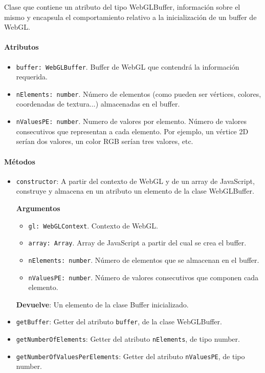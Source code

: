 Clase que contiene un atributo del tipo WebGLBuffer, información sobre el mismo y encapsula el comportamiento relativo a la inicialización de un buffer de WebGL. 

\paragraph*{Atributos}
\begin{itemize}
    \item \verb|buffer: WebGLBuffer|. Buffer de WebGL que contendrá la información requerida.
    \item \verb|nElements: number|. Número de elementos (como pueden ser vértices, colores, coordenadas de textura...) almacenadas en el buffer.
    \item \verb|nValuesPE: number|. Numero de valores por elemento. Número de valores consecutivos que representan a cada elemento. Por ejemplo, un vértice 2D serían dos valores, un color RGB serían tres valores, etc.
\end{itemize}

\paragraph*{Métodos}
\begin{itemize}
    \item \verb|constructor|: A partir del contexto de WebGL y de un array de JavaScript, construye y almacena en un atributo un elemento de la clase WebGLBuffer.
    
    \textbf{Argumentos}
    \begin{itemize}
        \item \verb|gl: WebGLContext|. Contexto de WebGL.
        \item \verb|array: Array|. Array de JavaScript a partir del cual se crea el buffer.
        \item \verb|nElements: number|. Número de elementos que se almacenan en el buffer.
        \item \verb|nValuesPE: number|. Número de valores consecutivos que componen cada elemento.
    \end{itemize}
    \textbf{Devuelve}: Un elemento de la clase Buffer inicializado.
    
    \item \verb|getBuffer|: Getter del atributo \verb|buffer|, de la clase WebGLBuffer.
    \item \verb|getNumberOfElements|: Getter del atributo \verb|nElements|, de tipo number.
    \item \verb|getNumberOfValuesPerElements|: Getter del atributo \verb|nValuesPE|, de tipo number.
\end{itemize}

